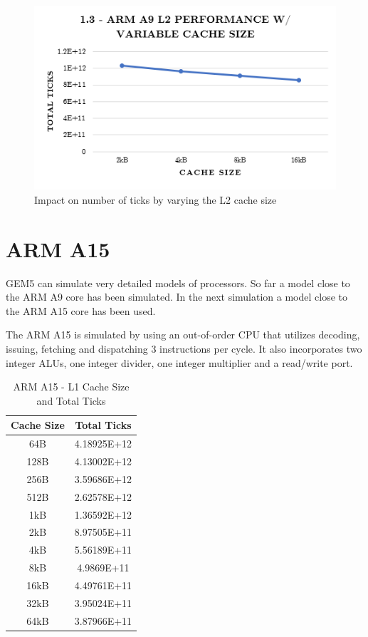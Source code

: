 \documentclass[a4paper, 10pt, conference]{ieeeconf}      %
\begin{document}
\begin{figure}[htb]
\centering
\includegraphics[scale=.5]{ex1_3.png}
\caption{Impact on number of ticks by varying the L2 cache size}
\label{fig:A9_size}
\end{figure}


\section{ARM A15}

GEM5 can simulate very detailed models of processors. So far a model close to the ARM A9 core has been simulated. In the next simulation a model close to the ARM A15 core has been used.

The ARM A15 is simulated by using an out-of-order CPU that utilizes decoding, issuing, fetching and dispatching 3 instructions per cycle. It also incorporates two integer ALUs, one integer divider, one integer multiplier and a read/write port.

\begin{table}[h]
\caption{ARM A15 - L1 Cache Size and Total Ticks}
\label{tab:A15}
\begin{center}
\begin{tabular}{|c||c|}
\hline
Cache Size & Total Ticks\\
\hline
64B & 4.18925E+12
\\
\hline
128B & 4.13002E+12
\\
\hline
256B & 3.59686E+12
\\
\hline
512B & 2.62578E+12
\\
\hline
1kB & 1.36592E+12
\\
\hline
2kB & 8.97505E+11
\\
\hline
4kB & 5.56189E+11
\\
\hline
8kB & 4.9869E+11
\\
\hline
16kB & 4.49761E+11
\\
\hline
32kB & 3.95024E+11
\\
\hline
64kB & 3.87966E+11
\\
\hline

\end{tabular}
\end{center}
\end{table}
\end{document}
